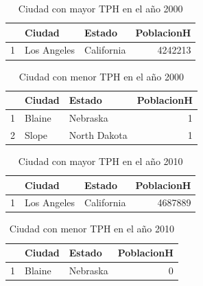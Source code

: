 \begin{table}[ht]
\centering
\begin{tabular}{rllr}
  \hline
 & Ciudad & Estado & PoblacionH \\ 
  \hline
1 & Los Angeles & California & 4242213 \\ 
   \hline
\end{tabular}
\caption{Ciudad con mayor TPH en el año 2000} 
\end{table}


\begin{table}[ht]
\centering
\begin{tabular}{rllr}
  \hline
 & Ciudad & Estado & PoblacionH \\ 
  \hline
1 & Blaine & Nebraska &   1 \\ 
  2 & Slope & North Dakota &   1 \\ 
   \hline
\end{tabular}
\caption{Ciudad con menor TPH en el año 2000} 
\end{table}


\begin{table}[ht]
\centering
\begin{tabular}{rllr}
  \hline
 & Ciudad & Estado & PoblacionH \\ 
  \hline
1 & Los Angeles & California & 4687889 \\ 
   \hline
\end{tabular}
\caption{Ciudad con mayor TPH en el año 2010} 
\end{table}


\begin{table}[ht]
\centering
\begin{tabular}{rllr}
  \hline
 & Ciudad & Estado & PoblacionH \\ 
  \hline
1 & Blaine & Nebraska &   0 \\ 
   \hline
\end{tabular}
\caption{Ciudad con menor TPH en el año 2010} 
\end{table}


